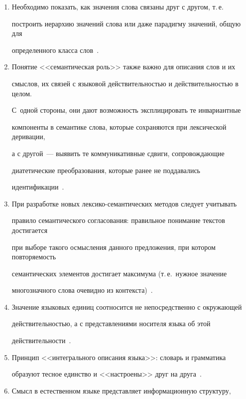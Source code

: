 \begin{enumerate}[1.]
получили объяснение особенности языкового поведения слова в данном его 


значении~\cite{6-2-11, 7-2-11}.


\item Необходимо показать, как значения слова связаны друг с другом, т.\,е.\ 


построить иерархию значений слова или даже парадигму значений, общую для 


определенного класса слов~\cite{6-2-11, 7-2-11}.


\item Понятие <<семантическая роль>> также важно для описания слов и их 


смыс\-лов, их связей с языковой действительностью и действительностью в целом. 


С~одной стороны, они дают возможность эксплицировать те инвариантные 


компоненты в семантике слова, которые сохраняются при лексической деривации, 


а с другой~--- выявить те коммуникативные сдвиги, сопровождающие 


диатетические преобразования, которые ранее не поддавались 


идентификации~\cite{6-2-11}.


\item При разработке новых лексико-семантических методов следует учитывать 


правило семантического согласования: правильное понимание текстов достигается 


при выборе такого осмысления данного предложения, при котором повторяемость 


семантических элементов достигает максимума (т.\,е.\ нужное значение 


многозначного слова очевидно из контекста)~\cite{10-2-11, 11-2-11}.


\item Значение языковых единиц соотносится не непосредственно с окружающей 


действительностью, а с представлениями носителя языка об этой 


действительности~\cite{14-2-11, 15-2-11}.


\item Принцип <<интегрального описания языка>>: словарь и грамматика 


образуют тесное единство и <<настроены>> друг на друга~\cite{17-2-11}.


\item Смысл в естественном языке представляет информационную структуру, 



\end{enumerate}
